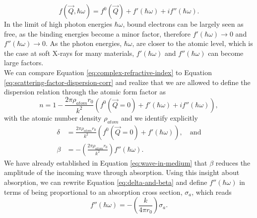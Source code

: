 \begin{equation}
f\left(\vec{Q},\hbar\omega\right)=f^{0}\left(\vec{Q}\right)+f'\left(\hbar\omega\right)+i f''\left(\hbar\omega\right).
\label{eq:scattering-factor-dispersion-corr}
\end{equation}
In the limit of high photon energies $\hbar \omega$, bound electrons can be largely seen as free, as the binding energies become a minor factor, therefore $f'\left(\hbar\omega\right)\rightarrow 0$ and $f''\left(\hbar\omega\right)\rightarrow 0$. As the photon energies, $\hbar \omega$, are closer to the atomic level, which is the case at soft X-rays for many materials, $f'\left(\hbar\omega\right)$ and $f''\left(\hbar\omega\right)$ can become large factors.\\[1\baselineskip]
We can compare Equation \eqref{eq:complex-refractive-index} to Equation \eqref{eq:scattering-factor-dispersion-corr} and realize that we are allowed to define the dispersion relation through the atomic form factor as \citep[see][p.~76]{Als-Nielson-2011-JWS}
\begin{equation}
n= 1- \frac{2\pi \rho_{atom}r_{0}}{k^{2}}\left(f^{0}\left(\vec{Q}=0\right)+f'\left(\hbar\omega\right)+i f''\left(\hbar\omega\right)\right),
\label{eq:eq:complex-refractive-index-atomic-factors}
\end{equation}
with the atomic number density $\rho_{atom}$ and we identify explicitly
\begin{align}
\delta &= \frac{2 \pi \rho_{atom} r_{0}}{k^{2}}\left(f^{0}\left(\vec{Q}=0\right)+f'\left(\hbar\omega\right)\right),\quad \text{and}\\
\beta &= - \left(\frac{2\pi \rho_{atom}r_{0}}{k^{2}}\right)f''\left(\hbar\omega\right).
\label{eq:delta-and-beta}
\end{align}
We have already established in Equation \eqref{eq:wave-in-medium} that $\beta$ reduces the amplitude of the incoming wave through absorption. Using this insight about absorption, we can rewrite Equation \eqref{eq:delta-and-beta} and define $f''\left(\hbar\omega\right)$ in terms of being proportional to an absorption cross section, $\sigma_{a}$, which reads
\begin{equation}
f''\left(\hbar\omega\right)=-\left(\frac{k}{4\pi r_{0}}\right)\sigma_{a}.
\label{eq:f-2-definition}
\end{equation}
